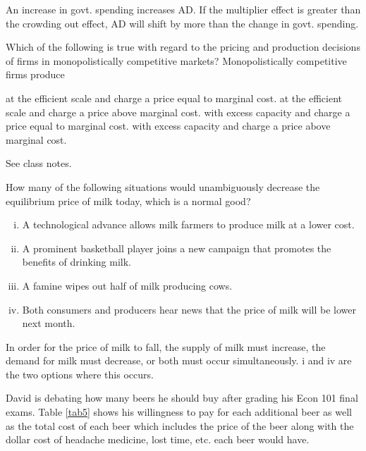 \documentclass[addpoints,11pt]{exam}
\theoremstyle{definition}
\begin{document}
\begin{questions}
\begin{solution}
An increase in govt. spending increases AD. If the multiplier effect is greater than the crowding out effect, AD will shift by more than the change in govt. spending.
\end{solution}

\newpage

\question Which of the following is true with regard to the pricing and production decisions of firms in monopolistically competitive markets? Monopolistically competitive firms produce

\begin{choices}
\choice at the efficient scale and charge a price equal to marginal cost.
\choice at the efficient scale and charge a price above marginal cost.
\choice with excess capacity and charge a price equal to marginal cost.
\CorrectChoice with excess capacity and charge a price above marginal cost.
\end{choices}

\begin{solution}
See class notes.
\end{solution}

\question How many of the following situations would unambiguously decrease the equilibrium price of milk today, which is a normal good?

\begin{enumerate}[i.]
	\item A technological advance allows milk farmers to produce milk at a lower cost.
	\item A prominent basketball player joins a new campaign that promotes the benefits of drinking milk.
	\item A famine wipes out half of milk producing cows.
	\item Both consumers and producers hear news that the price of milk will be lower next month.
\end{enumerate}

\begin{choices}
\end{choices}

\begin{solution}
In order for the price of milk to fall, the supply of milk must increase, the demand for milk must decrease, or both must occur simultaneously. i and iv are the two options where this occurs.
\end{solution}

\question David is debating how many beers he should buy after grading his Econ 101 final exams. Table \ref{tab5} shows his willingness to pay for each additional beer as well as the total cost of each beer which includes the price of the beer along with the dollar cost of headache medicine, lost time, etc. each beer would have. 


\end{questions}
\end{document}
